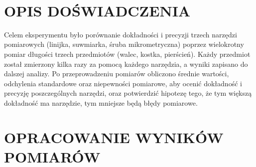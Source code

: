 \documentclass{article}
\begin{document}
\textbf{} \\
\centering

\section*{OPIS DOŚWIADCZENIA}

{Celem eksperymentu było porównanie dokładności i precyzji trzech narzędzi pomiarowych (linijka, suwmiarka, śruba mikrometryczna) poprzez wielokrotny pomiar długości trzech przedmiotów (walec, kostka, pierścień). Każdy przedmiot został zmierzony kilka razy za pomocą każdego narzędzia, a wyniki zapisano do dalszej analizy. Po przeprowadzeniu pomiarów obliczono średnie wartości, odchylenia standardowe oraz niepewności pomiarowe, aby ocenić dokładność i precyzję poszczególnych narzędzi, oraz potwierdzić hipotezę tego, że tym większą dokładność ma narzędzie, tym mniejsze będą błędy pomiarowe.}

\section*{OPRACOWANIE WYNIKÓW POMIARÓW}
\end{document}
